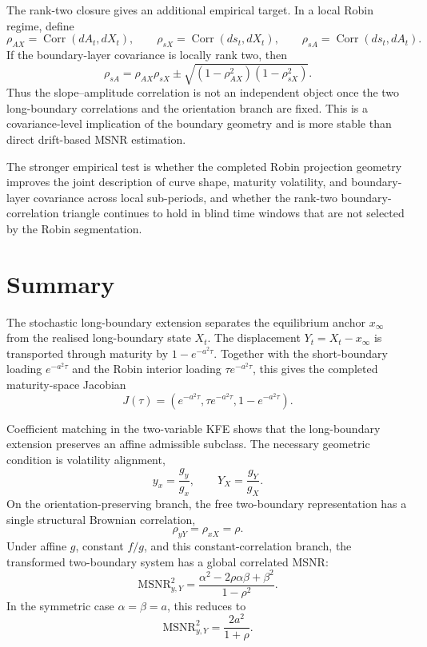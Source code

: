 \documentclass[11pt]{article}
\numberwithin{equation}{section}
\begin{document}
The rank-two closure gives an additional empirical target.  In a local Robin regime, define
\[
        \rho_{AX}=\operatorname{Corr}(dA_t,dX_t),
        \qquad
        \rho_{sX}=\operatorname{Corr}(ds_t,dX_t),
        \qquad
        \rho_{sA}=\operatorname{Corr}(ds_t,dA_t).
\]
If the boundary-layer covariance is locally rank two, then
\[
        \rho_{sA}
        =
        \rho_{AX}\rho_{sX}
        \pm
        \sqrt{(1-\rho_{AX}^2)(1-\rho_{sX}^2)}.
\]
Thus the slope--amplitude correlation is not an independent object once the two long-boundary correlations and the orientation branch are fixed.  This is a covariance-level implication of the boundary geometry and is more stable than direct drift-based MSNR estimation.

The stronger empirical test is whether the completed Robin projection geometry improves the joint description of curve shape, maturity volatility, and boundary-layer covariance across local sub-periods, and whether the rank-two boundary-correlation triangle continues to hold in blind time windows that are not selected by the Robin segmentation.


\section{Summary}

The stochastic long-boundary extension separates the equilibrium anchor \(x_\infty\) from the realised long-boundary state \(X_t\). The displacement \(Y_t=X_t-x_\infty\) is transported through maturity by \(1-e^{-a^2\tau}\). Together with the short-boundary loading \(e^{-a^2\tau}\) and the Robin interior loading \(\tau e^{-a^2\tau}\), this gives the completed maturity-space Jacobian
\[
J(\tau)=
\left(
 e^{-a^2\tau},
 \tau e^{-a^2\tau},
 1-e^{-a^2\tau}
\right).
\]

Coefficient matching in the two-variable KFE shows that the long-boundary extension preserves an affine admissible subclass. The necessary geometric condition is volatility alignment,
\[
y_x=\frac{g_y}{g_x},
\qquad
Y_X=\frac{g_Y}{g_X}.
\]
On the orientation-preserving branch, the free two-boundary representation has a single structural Brownian correlation,
\[
\rho_{yY}=\rho_{xX}=\rho.
\]
Under affine \(g\), constant \(f/g\), and this constant-correlation branch, the transformed two-boundary system has a global correlated MSNR:
\[
\mathrm{MSNR}_{y,Y}^2
=
\frac{\alpha^2-2\rho\alpha\beta+\beta^2}{1-\rho^2}.
\]
In the symmetric case \(\alpha=\beta=a\), this reduces to
\[
\mathrm{MSNR}_{y,Y}^2=\frac{2a^2}{1+\rho}.
\]
\end{document}
